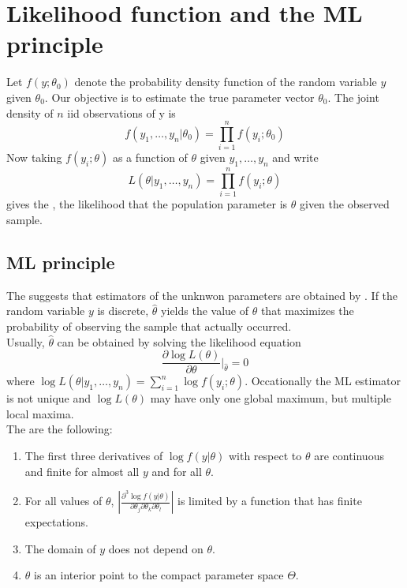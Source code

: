 \ChapterHeading

\section{Likelihood function and the ML principle}

Let $f(y;\theta_0)$ denote the probability density function of the random variable $y$ given $\theta_0$.
Our objective is to estimate the true parameter vector $\theta_0$.
The joint density of $n$ iid observations of y is
\begin{equation}
    f(y_1,\ldots,y_n|\theta_0) = \prod_{i=1}^{n}f(y_i;\theta_0)
\end{equation}
Now taking $f(y_i;\theta)$ as a function of $\theta$ given $y_1,\ldots,y_n$ and write
\begin{equation}
    L(\theta|y_1,\ldots,y_n) = \prod_{i=1}^{n}f(y_i;\theta)
\end{equation}
gives the , the likelihood that the population parameter is $\theta$ given the observed sample.

\subsection{ML principle}
The  suggests that estimators of the unknwon parameters 
are obtained by . 
If the random variable $y$ is discrete, $\hat{\theta}$ yields the value of $\theta$ that maximizes
the probability of observing the sample that actually occurred.\\

Usually, $\hat{\theta}$ can be obtained by solving the likelihood equation
\begin{equation}
    \frac{\partial \log L(\theta)}{\partial \theta}|_{\hat{\theta}}=0
\end{equation}
where $\log L(\theta|y_1,\ldots,y_n) = \sum_{i=1}^{n}\log f(y_i;\theta)$.
Occationally the ML estimator is not unique and $\log L(\theta)$ may have only one global maximum,
but multiple local maxima.\\

The  are the following:
\begin{enumerate}
    \item The first three derivatives of $\log f(y|\theta)$ with respect to $\theta$ are continuous and finite
    for almost all $y$ and for all $\theta$.
    \item For all values of $\theta$, $|\frac{\partial^3\log f(y|\theta)}{\partial\theta_j\partial\theta_k\partial\theta_l}|$
    is limited by a function that has finite expectations.
    \item The domain of $y$ does not depend on $\theta$.
    \item $\theta$ is an interior point to the compact parameter space $\Theta$.
\end{enumerate}

